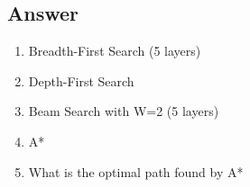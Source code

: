 \documentclass[11pt]{article}
\begin{document}
\begin{flushleft}
\subsection*{Answer}
\begin{enumerate}
    \item Breadth-First Search (5 layers)
    \item Depth-First Search
    \item Beam Search with W=2 (5 layers)
    \item A*
    \item What is the optimal path found by A*
\end{enumerate}

\end{flushleft}
\end{document}
